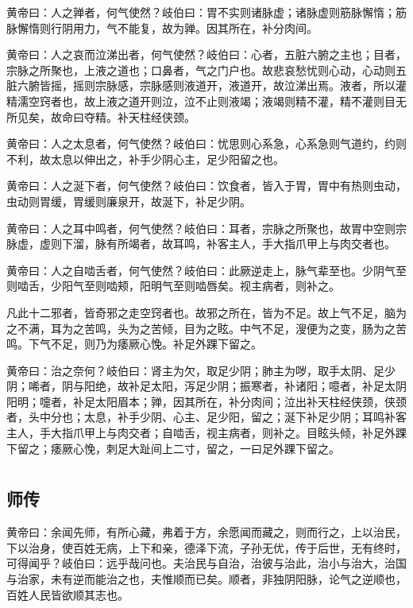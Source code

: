 \documentclass[a4paper,12pt,UTF8,twoside]{ctexbook}
\begin{document}
	黄帝曰：人之亸者，何气使然？岐伯曰：胃不实则诸脉虚；诸脉虚则筋脉懈惰；筋脉懈惰则行阴用力，气不能复，故为亸。因其所在，补分肉间。
	
	黄帝曰：人之哀而泣涕出者，何气使然？岐伯曰：心者，五脏六腑之主也；目者，宗脉之所聚也，上液之道也；口鼻者，气之门户也。故悲哀愁忧则心动，心动则五脏六腑皆摇，摇则宗脉感，宗脉感则液道开，液道开，故泣涕出焉。液者，所以灌精濡空窍者也，故上液之道开则泣，泣不止则液竭；液竭则精不灌，精不灌则目无所见矣，故命曰夺精。补天柱经侠颈。
	
	黄帝曰：人之太息者，何气使然？岐伯曰：忧思则心系急，心系急则气道约，约则不利，故太息以伸出之，补手少阴心主，足少阳留之也。
	
	黄帝曰：人之涎下者，何气使然？岐伯曰：饮食者，皆入于胃，胃中有热则虫动，虫动则胃缓，胃缓则廉泉开，故涎下，补足少阴。
	
	黄帝曰：人之耳中鸣者，何气使然？岐伯曰：耳者，宗脉之所聚也，故胃中空则宗脉虚，虚则下溜，脉有所竭者，故耳鸣，补客主人，手大指爪甲上与肉交者也。
	
	黄帝曰：人之自啮舌者，何气使然？岐伯曰：此厥逆走上，脉气辈至也。少阴气至则啮舌，少阳气至则啮颊，阳明气至则啮唇矣。视主病者，则补之。
	
	凡此十二邪者，皆奇邪之走空窍者也。故邪之所在，皆为不足。故上气不足，脑为之不满，耳为之苦鸣，头为之苦倾，目为之眩。中气不足，溲便为之变，肠为之苦鸣。下气不足，则乃为痿厥心悗。补足外踝下留之。
	
	黄帝曰：治之奈何？岐伯曰：肾主为欠，取足少阴；肺主为哕，取手太阴、足少阴；唏者，阴与阳绝，故补足太阳，泻足少阴；振寒者，补诸阳；噫者，补足太阴阳明；嚏者，补足太阳眉本；亸，因其所在，补分肉间；泣出补天柱经侠颈，侠颈者，头中分也；太息，补手少阴、心主、足少阳，留之；涎下补足少阴；耳鸣补客主人，手大指爪甲上与肉交者；自啮舌，视主病者，则补之。目眩头倾，补足外踝下留之；痿厥心悗，刺足大趾间上二寸，留之，一曰足外踝下留之。
	
	\part{}
	\chapter{师传}
	
	黄帝曰：余闻先师，有所心藏，弗着于方，余愿闻而藏之，则而行之，上以治民，下以治身，使百姓无病，上下和亲，德泽下流，子孙无优，传于后世，无有终时，可得闻乎？岐伯曰：远乎哉问也。夫治民与自治，治彼与治此，治小与治大，治国与治家，未有逆而能治之也，夫惟顺而已矣。顺者，非独阴阳脉，论气之逆顺也，百姓人民皆欲顺其志也。
	
\end{document}
